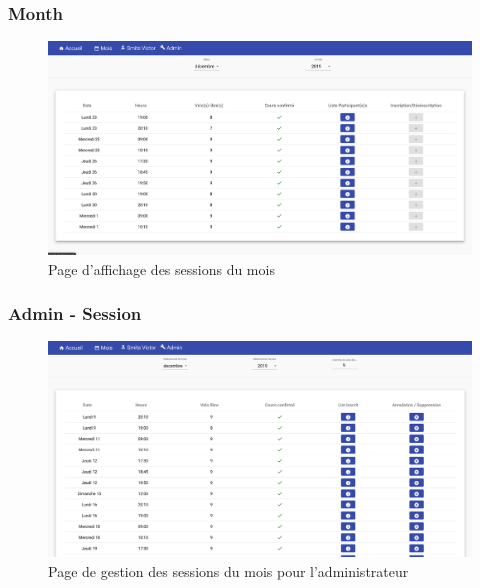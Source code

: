        
       
	\newpage
	\subsubsection{Month}
		\begin{figure}[h!]
       	 	\includegraphics[width=0.8\linewidth, center]{Mockup/Month.png}
       	 	\caption{Page d'affichage des sessions du mois}
       	\end{figure}
       	

	\vspace{\baselineskip}	
	\subsubsection{Admin - Session}
		\begin{figure}[h!]
       	 	\includegraphics[width=0.8\linewidth, center]{Mockup/Admin-Session.png}
       	 	\caption{Page de gestion des sessions du mois pour l'administrateur}
       	\end{figure}
       	
	\newpage
